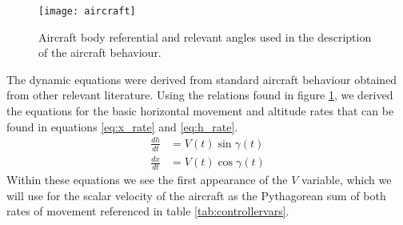 \documentclass[english,palatino]{ist-report}
\begin{document}
\begin{figure}
	\centering
	\texttt{[image: aircraft]}
	\caption{Aircraft body referential and relevant angles used in the description of the aircraft behaviour.}
	\label{fig:bodyref}
\end{figure}

The dynamic equations were derived from standard aircraft behaviour obtained from other relevant literature. Using the relations found in figure \ref{fig:bodyref}, we derived the equations for the basic horizontal movement and altitude rates that can be found in equations \ref{eq:x_rate} and \ref{eq:h_rate}.
\begin{align}\label{eq:x_rate}
	\frac{dh}{dt} &= V(t)\sin{\gamma(t)} \\
	\label{eq:h_rate}
	\frac{dx}{dt} &= V(t)\cos{\gamma(t)}
\end{align}
Within these equations we see the first appearance of the $V$ variable, which we will use for the scalar velocity of the aircraft as the Pythagorean sum of both rates of movement referenced in table \ref{tab:controllervars}.
\end{document}
